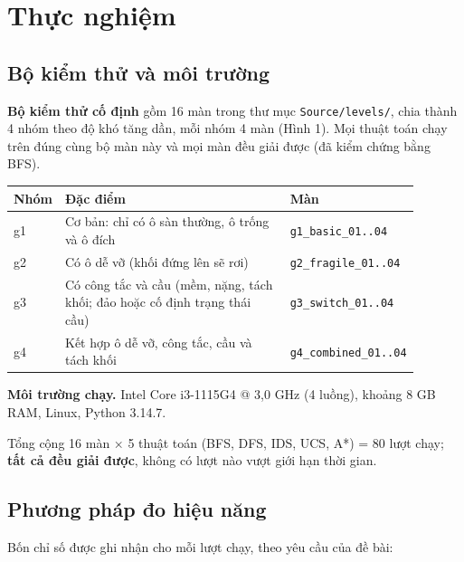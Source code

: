 \section{Thực nghiệm}

\subsection{Bộ kiểm thử và môi trường}

\textbf{Bộ kiểm thử cố định} gồm 16 màn trong thư mục \texttt{Source/levels/}, chia thành 4 nhóm theo độ khó tăng dần, mỗi nhóm 4 màn (Hình 1). Mọi thuật toán chạy trên đúng cùng bộ màn này và mọi màn đều giải được (đã kiểm chứng bằng BFS).

{\renewcommand{\arraystretch}{1.25}
\begin{longtable}{|>{\raggedright\arraybackslash}p{0.098\linewidth}|>{\raggedright\arraybackslash}p{0.600\linewidth}|>{\raggedright\arraybackslash}p{0.196\linewidth}|}
\hline
\textbf{Nhóm} & \textbf{Đặc điểm} & \textbf{Màn} \\ \hline
\endhead
\hline
\endlastfoot
g1 & Cơ bản: chỉ có ô sàn thường, ô trống và ô đích & \texttt{g1\_\allowbreak{}basic\_\allowbreak{}01..04} \\ \hline
g2 & Có ô dễ vỡ (khối đứng lên sẽ rơi) & \texttt{g2\_\allowbreak{}fragile\_\allowbreak{}01..04} \\ \hline
g3 & Có công tắc và cầu (mềm, nặng, tách khối; đảo hoặc cố định trạng thái cầu) & \texttt{g3\_\allowbreak{}switch\_\allowbreak{}01..04} \\ \hline
g4 & Kết hợp ô dễ vỡ, công tắc, cầu và tách khối & \texttt{g4\_\allowbreak{}combined\_\allowbreak{}01..04} \\
\end{longtable}
}

\textbf{Môi trường chạy.} Intel Core i3-1115G4 @ 3,0 GHz (4 luồng), khoảng 8 GB RAM, Linux, Python 3.14.7.

Tổng cộng 16 màn × 5 thuật toán (BFS, DFS, IDS, UCS, A*) = 80 lượt chạy; \textbf{tất cả đều giải được}, không có lượt nào vượt giới hạn thời gian.

\subsection{Phương pháp đo hiệu năng}

Bốn chỉ số được ghi nhận cho mỗi lượt chạy, theo yêu cầu của đề bài:

